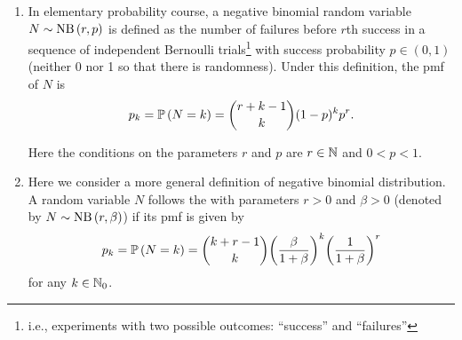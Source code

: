 \begin{enumerate}
\item \label{it:nb-dist-elementary-def}
In elementary probability course, a negative binomial random variable
\(N\sim\operatorname{NB}\left(r,p\right)\) is defined as the number of failures before \(r\)th success in a sequence
of independent Bernoulli trials\footnote{i.e., experiments with two possible outcomes:
``success'' and ``failures''} with success probability \(p\in(0,1)\) (neither 0
nor 1 so that there is randomness). Under this definition, the pmf of \(N\) is
\[
p_k=\mathbb{P}\left(N=k\right)=\binom{r+k-1}{k}(1-p)^kp^r.
\]
\begin{center}
\end{center}
Here the conditions on the parameters \(r\) and \(p\) are \(r\in\mathbb{N}\) and
\(0<p<1\).

\item Here we consider a more general definition of negative binomial
distribution. A random variable \(N\) follows the  with parameters \(r>0\) and \(\beta>0\) (denoted by
\(N\sim\operatorname{NB}\left(r,\beta\right)\)) if its pmf is given by
\begin{equation}
\label{eq:nb-def}
p_k=\mathbb{P}\left(N=k\right)=\binom{k+r-1}{k}\qty(\frac{\beta}{1+\beta})^k\qty(\frac{1}{1+\beta})^{r}
\end{equation}
for any \(k\in\mathbb{N}_0\).


\end{enumerate}
